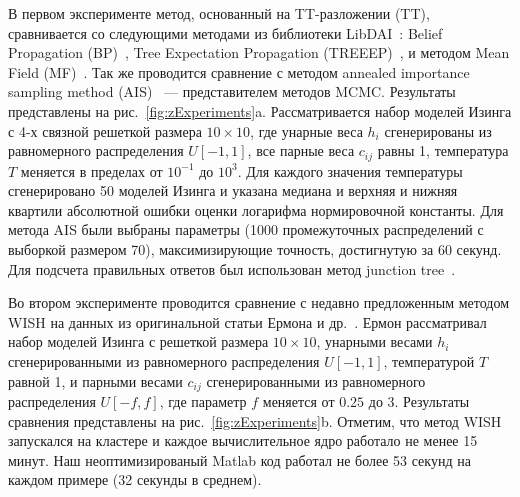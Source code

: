 В первом эксперименте метод, основанный на TT\hyp{}разложении (TT), сравнивается со следующими методами из библиотеки LibDAI~\cite{mooij10libdai}: Belief Propagation (BP)~\cite{kschischang01bp}, Tree Expectation Propagation (TREEEP)~\cite{minka04treeep}, и методом Mean Field (MF)~\cite{wainwright08gm}. Так же проводится сравнение с методом annealed importance sampling method (AIS)~\cite{neal01ais} --- представителем методов MCMC. Результаты представлены на рис.~\ref{fig:zExperiments}a. Рассматривается набор моделей Изинга с 4-х связной решеткой размера $10 \times 10$, где унарные веса $h_i$ сгенерированы из равномерного распределения $U[-1, 1]$, все парные веса $c_{ij}$ равны 1, температура $T$ меняется в пределах от $10^{-1}$ до $10^{3}$. Для каждого значения температуры сгенерировано 50 моделей Изинга и указана медиана и верхняя и нижняя квартили абсолютной ошибки оценки логарифма нормировочной константы. Для метода AIS были выбраны параметры (1000 промежуточных распределений с выборкой размером 70), максимизирующие точность, достигнутую за 60 секунд. Для подсчета правильных ответов был использован метод junction tree~\cite{wainwright08gm}.



Во втором эксперименте проводится сравнение с недавно предложенным методом WISH на данных из оригинальной статьи Ермона и др.~\cite{ermon13wish}. Ермон рассматривал набор моделей Изинга с решеткой размера $10 \times 10$, унарными весами $h_i$ сгенерированными из равномерного распределения $U[-1, 1]$, температурой $T$ равной 1, и парными весами $c_{ij}$ сгенерированными из равномерного распределения $U[-f, f]$, где параметр $f$ меняется от $0.25$ до $3$. Результаты сравнения представлены на рис.~\ref{fig:zExperiments}b. Отметим, что метод WISH запускался на кластере и каждое вычислительное ядро работало не менее 15 минут. Наш неоптимизированый Matlab код работал не более 53 секунд на каждом примере (32 секунды в среднем).

